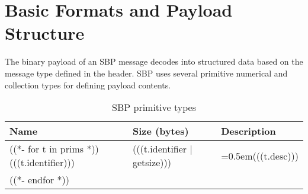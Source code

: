 \documentclass[9pt]{extarticle}
\numberwithin{table}{subsection}
\numberwithin{field}{subsection}
\begin{document}
\newpage

\section{Basic Formats and Payload Structure}
\label{sec:Payload}
\begin{large}
The binary payload of an SBP message decodes into structured data
based on the message type defined in the header. SBP uses several
primitive numerical and collection types for defining payload
contents.
\end{large}
\begin{table}[h]
  \centering
  \begin{tabularx}{\textwidth}{aaX}
    \toprule
    Name & Size (bytes) & Description \\
    \midrule
    ((*- for t in prims *))
    (((t.identifier))) & (((t.identifier | getsize))) & \hangindent=0.5em{(((t.desc)))} \\
    ((*- endfor *))
    \bottomrule
  \end{tabularx}
  \caption{SBP primitive types}
  \label{tab:types}
\end{table}
\hspace{-5em}
\end{document}
